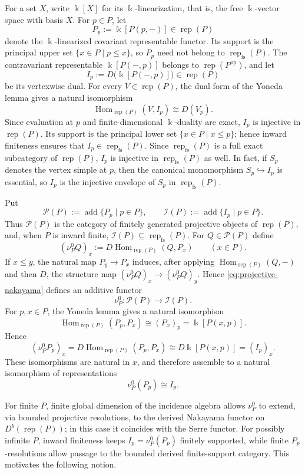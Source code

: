 \documentclass[10pt,a4paper]{amsart}
\newcommand{\Rep}{\operatorname{rep}}
\newcommand{\Hom}{\operatorname{Hom}}
\begin{document}
For a set $X$, write $\Bbbk[X]$ for its $\Bbbk$-linearization, that is, the
free $\Bbbk$-vector space with basis $X$.  For $p\in P$, let
\[
P_p:=\Bbbk[P(p,-)]\in\Rep(P)
\]
denote the $\Bbbk$-linearized covariant representable functor.  Its support is
the principal upper set $\{x\in P\mid p\le x\}$, so $P_p$ need not belong to
$\Rep_{\mathrm{fs}}(P)$.  The contravariant representable
$\Bbbk[P(-,p)]$ belongs to $\Rep(P^{\mathrm{op}})$, and let
\[
I_p:=D\!\bigl(\Bbbk[P(-,p)]\bigr)\in\Rep(P)
\]
be its vertexwise dual.  For every $V\in\Rep(P)$, the dual form of the
Yoneda lemma gives a natural isomorphism
\[
\Hom_{\Rep(P)}(V,I_p)\cong D(V_p).
\]
Since evaluation at $p$ and finite-dimensional $\Bbbk$-duality are exact,
$I_p$ is injective in $\Rep(P)$.  Its support is the principal lower set
$\{x\in P\mid x\le p\}$; hence inward finiteness ensures that
$I_p\in\Rep_{\mathrm{fs}}(P)$.  Since $\Rep_{\mathrm{fs}}(P)$ is a full
exact subcategory of $\Rep(P)$, $I_p$ is injective in
$\Rep_{\mathrm{fs}}(P)$ as well.  In fact, if $S_p$ denotes the vertex
simple at $p$, then the canonical monomorphism $S_p\hookrightarrow I_p$ is
essential, so $I_p$ is the injective envelope of $S_p$ in
$\Rep_{\mathrm{fs}}(P)$.

Put
\[
\mathcal P(P):=\operatorname{add}\{P_p\mid p\in P\},
\qquad
\mathcal I(P):=\operatorname{add}\{I_p\mid p\in P\}.
\]
Thus $\mathcal P(P)$ is the category of finitely generated projective objects
of $\Rep(P)$, and, when $P$ is inward finite,
$\mathcal I(P)\subseteq\Rep_{\mathrm{fs}}(P)$.  For
$Q\in\mathcal P(P)$ define
\begin{equation}\label{eq:projective-nakayama}
(\nu_P^0 Q)_x
:=
D\Hom_{\Rep(P)}(Q,P_x)
\qquad(x\in P).
\end{equation}
If $x\le y$, the natural map $P_y\to P_x$ induces, after applying
$\Hom_{\Rep(P)}(Q,-)$ and then $D$, the structure map
$(\nu_P^0Q)_x\to(\nu_P^0Q)_y$.  Hence \eqref{eq:projective-nakayama} defines
an additive functor
\[
\nu_P^0:\mathcal P(P)\longrightarrow\mathcal I(P).
\]
For $p,x\in P$, the Yoneda lemma gives a natural isomorphism
\[
\Hom_{\Rep(P)}(P_p,P_x)
\cong
(P_x)_p
=
\Bbbk[P(x,p)].
\]
Hence
\[
(\nu_P^0P_p)_x
=
D\Hom_{\Rep(P)}(P_p,P_x)
\cong
D\Bbbk[P(x,p)]
=
(I_p)_x.
\]
These isomorphisms are natural in $x$, and therefore assemble to a natural
isomorphism of representations
\[
\nu_P^0(P_p)\cong I_p.
\]

For finite $P$, finite global dimension of the incidence algebra allows
$\nu_P^0$ to extend, via bounded projective resolutions, to the derived
Nakayama functor on $D^b(\Rep(P))$; in this case it coincides with the Serre
functor.  For possibly infinite $P$, inward finiteness keeps
$I_p=\nu_P^0(P_p)$ finitely supported,
while finite $P_p$-resolutions allow passage to the bounded derived
finite-support category.  This motivates the following notion.
\end{document}
